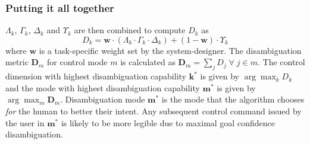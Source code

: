 \documentclass[conference]{IEEEtran}
\newcommand{\argmax}{\arg\!\max}
\begin{document}
\subsubsection*{Putting it all together}
$\Lambda_{k}$, $\Gamma_{k}$, $\Delta_{k}$ and $\Upsilon_{k}$ are then combined to compute $D_{k}$ as 
\begin{equation*}\label{DK}
D_{k} = \boldsymbol{w}\cdot(\Lambda_{k}\cdot \Gamma_{k}\cdot \Delta_{k}) + (1 - \boldsymbol{w})\cdot \Upsilon_{k}
\end{equation*}
where $\boldsymbol{w}$ is a task-specific weight set by the system-designer.
The disambiguation metric $\boldsymbol{D}_m$ for control mode $m$ is calculated as $\boldsymbol{D}_m = \sum_{j} D_{j} \;\forall \;j\in m$.
The control dimension with highest disambiguation capability $\boldsymbol{k}^*$ is given by $\argmax_k D_{k}$
 and the mode with highest disambiguation capability $\boldsymbol{m}^{*}$ is given by $\argmax_m \boldsymbol{D}_m$.
Disambiguation mode $\boldsymbol{m}^{*}$ is the mode that the algorithm chooses \textit{for} the human to better their intent. Any subsequent control command issued by the user in $\boldsymbol{m}^*$ is likely to be more legible due to maximal goal confidence disambiguation.
\end{document}
